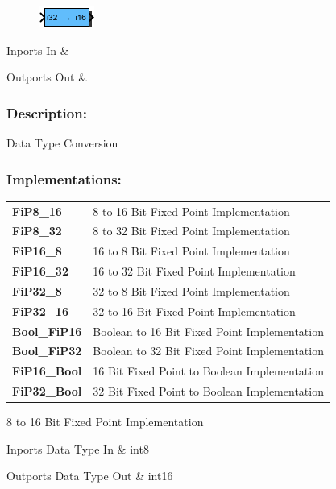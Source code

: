 \label{block:TypeConv}
\begin{figure}[H]\includegraphics{TypeConv}\end{figure} 

\begin{XtoCtabular}{Inports}
In & \tabularnewline
\hline
\end{XtoCtabular}


\begin{XtoCtabular}{Outports}
Out & \tabularnewline
\hline
\end{XtoCtabular}

\subsubsection*{Description:}
Data Type Conversion

\subsubsection*{Implementations:}
\begin{tabular}{l l}
\textbf{FiP8\_16} & 8 to 16 Bit Fixed Point Implementation\tabularnewline
\textbf{FiP8\_32} & 8 to 32 Bit Fixed Point Implementation\tabularnewline
\textbf{FiP16\_8} & 16 to 8 Bit Fixed Point Implementation\tabularnewline
\textbf{FiP16\_32} & 16 to 32 Bit Fixed Point Implementation\tabularnewline
\textbf{FiP32\_8} & 32 to 8 Bit Fixed Point Implementation\tabularnewline
\textbf{FiP32\_16} & 32 to 16 Bit Fixed Point Implementation\tabularnewline
\textbf{Bool\_FiP16} & Boolean to 16 Bit Fixed Point Implementation\tabularnewline
\textbf{Bool\_FiP32} & Boolean to 32 Bit Fixed Point Implementation\tabularnewline
\textbf{FiP16\_Bool} & 16 Bit Fixed Point to Boolean Implementation\tabularnewline
\textbf{FiP32\_Bool} & 32 Bit Fixed Point to Boolean Implementation\tabularnewline
\end{tabular}

\nopagebreak[0]

8 to 16 Bit Fixed Point Implementation

\begin{XtoCtabular}{Inports Data Type}
In & int8\tabularnewline
\hline
\end{XtoCtabular}

\begin{XtoCtabular}{Outports Data Type}
Out & int16\tabularnewline
\hline
\end{XtoCtabular}


